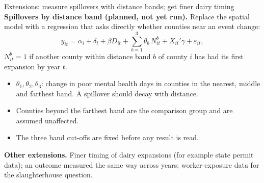 \documentclass[aspectratio=169]{beamer}
\begin{document}
\begin{frame}{Extensions: measure spillovers with distance bands; get finer dairy timing}
\footnotesize
\textbf{Spillovers by distance band (planned, not yet run).} Replace the spatial model with a regression that asks directly whether counties near an event change:
\[ y_{it}=\alpha_i+\delta_t+\beta D_{it}+\sum_{b=1}^{3}\theta_b\,N^{b}_{it}+X_{it}'\gamma+\varepsilon_{it}, \]
$N^{b}_{it}=1$ if another county within distance band $b$ of county $i$ has had its first expansion by year $t$.\par
\vspace{3pt}
\begin{itemize}\footnotesize\setlength\itemsep{2pt}
  \item $\theta_1,\theta_2,\theta_3$: change in poor mental health days in counties in the nearest, middle and farthest band. A spillover should decay with distance.
  \item Counties beyond the farthest band are the comparison group and are assumed unaffected.
  \item The three band cut-offs are fixed before any result is read.
\end{itemize}
\vspace{3pt}
\textbf{Other extensions.} Finer timing of dairy expansions (for example state permit data); an outcome measured the same way across years; worker-exposure data for the slaughterhouse question.
\end{frame}
\end{document}
